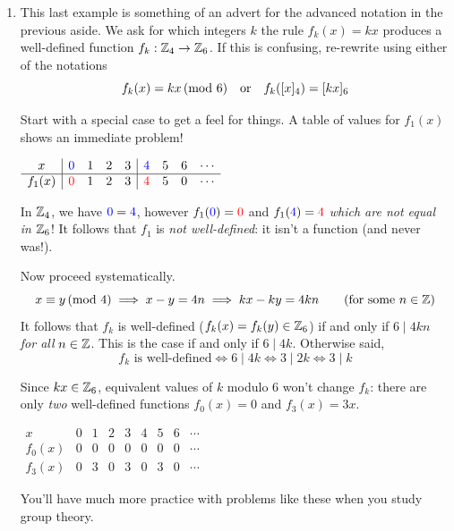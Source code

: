 \begin{examples}{}{}
\begin{enumerate}
	
		\item This last example is something of an advert for the advanced notation in the previous aside. We ask for which integers $k$ the rule $f_k(x)=kx$ produces a well-defined function $f_k:\mathbb{Z}_4\to\mathbb{Z}_6$. If this is confusing, re-rewrite using either of the notations
		\[
			f_k(x)=kx\negthickspace\pmod{6} \quad\text{or}\quad f_k([x]_4)=[kx]_6
		\]		
		\begin{minipage}[t]{0.59\linewidth}\vspace{-10pt}
		 	Start with a special case to get a feel for things. A table of values for $f_1(x)$ shows an immediate problem! 
		\end{minipage}
		\hfill
		\begin{minipage}[t]{0.4\linewidth}\vspace{-12pt}
		  \hfill $\begin{array}{c|cccc|cccc}
				x&\textcolor{blue}{0}&1&2&3&\textcolor{blue}{4}&5&6&\cdots\\\hline
				f_1(x)&\textcolor{red}{0}&1&2&3&\textcolor{red}{4}&5&0&\cdots
			\end{array}$
		\end{minipage}\par
		In $\mathbb{Z}_4$, we have $\textcolor{blue}{0}=\textcolor{blue}{4}$, however $f_1(\textcolor{blue}{0})=\textcolor{red}{0}$ and $f_1(\textcolor{blue}{4})=\textcolor{red}{4}$ \emph{which are not equal in $\mathbb{Z}_6$}! It follows that $f_1$ is \emph{not well-defined}: it isn't a function (and never was!).\par
		Now proceed systematically.
		\[
			x\equiv y\spmod 4\implies x-y=4n \implies kx-ky=4kn \tag{for some $n\in\Z$}
		\]
		It follows that $f_k$ is well-defined ($f_k(x)=f_k(y)\in\mathbb{Z}_6$) if and only if $6\mid 4kn$\, \emph{for all} $n\in\mathbb{Z}$. This is the case if and only if $6\mid 4k$. Otherwise said,
		\[
			\text{$f_k$ is well-defined}\iff 6\mid 4k\iff 3\mid 2k\iff 3\mid k
		\]
		\begin{minipage}[t]{0.59\linewidth}\vspace{-10pt}
			Since $kx\in\mathbb{Z}_6$, equivalent values of $k$ modulo 6 won't change $f_k$: there are only \emph{two} well-defined functions $f_0(x)=0$ and $f_3(x)=3x$.
		\end{minipage}
		\hfill
		\begin{minipage}[t]{0.4\linewidth}\vspace{-12pt}
		  \hfill $\begin{array}{c|cccc|cccc}
				x&0&1&2&3&4&5&6&\cdots\\\hline
				f_0(x)&0&0&0&0&0&0&0&\cdots\\\hline
				f_3(x)&0&3&0&3&0&3&0&\cdots
			\end{array}$
		\end{minipage}\smallbreak
		You'll have much more practice with problems like these when you study group theory.
	\end{enumerate}
\end{examples}



